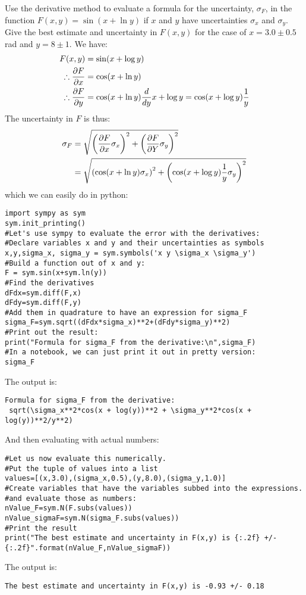 \begin{example}{}{Use the derivative method to evaluate a formula for the uncertainty, $\sigma_{F}$, in the function $F(x,y)=\sin(x+\ln y)$ if $x$ and $y$ have uncertainties $\sigma_{x}$ and $\sigma_{y}$. Give the best estimate and uncertainty in $F(x,y)$ for the case of $x=3.0\pm0.5$\,rad and $y=8\pm1$.}{}
We have:
\begin{align*}
F(x,y)&=\sin(x+\log y)\\
\therefore \frac{\partial F}{\partial x}&=\cos(x+\ln y)\\
\therefore \frac{\partial F}{\partial y}&=\cos(x+\ln y)\frac{d}{dy}x+\log y=\cos(x+\log y)\frac{1}{y}
\end{align*}
The uncertainty in $F$ is thus:
\begin{align*}
\sigma_{F}&= \sqrt{\left(\frac{\partial F}{\partial x}\sigma_{x}\right)^2 + \left(\frac{\partial F}{\partial Y} \sigma_{y}\right)^2}\\
  &= \sqrt{\left(\cos(x+\ln y)\sigma_{x}\right)^2 + \left(\cos(x+\log y)\frac{1}{y} \sigma_{y}\right)^2}\\
\end{align*}
which we can easily do in python:
\begin{lstlisting}[frame=single] 
import sympy as sym
sym.init_printing()
#Let's use sympy to evaluate the error with the derivatives:
#Declare variables x and y and their uncertainties as symbols
x,y,sigma_x, sigma_y = sym.symbols('x y \sigma_x \sigma_y')  
#Build a function out of x and y:
F = sym.sin(x+sym.ln(y)) 
#Find the derivatives
dFdx=sym.diff(F,x)
dFdy=sym.diff(F,y)
#Add them in quadrature to have an expression for sigma_F
sigma_F=sym.sqrt((dFdx*sigma_x)**2+(dFdy*sigma_y)**2)
#Print out the result:
print("Formula for sigma_F from the derivative:\n",sigma_F)
#In a notebook, we can just print it out in pretty version:
sigma_F
\end{lstlisting}
The output is:
\begin{verbatim}
Formula for sigma_F from the derivative:
 sqrt(\sigma_x**2*cos(x + log(y))**2 + \sigma_y**2*cos(x + log(y))**2/y**2)
\end{verbatim}
And then evaluating with actual numbers:
\begin{lstlisting}[frame=single] 
#Let us now evaluate this numerically.
#Put the tuple of values into a list
values=[(x,3.0),(sigma_x,0.5),(y,8.0),(sigma_y,1.0)]
#Create variables that have the variables subbed into the expressions.
#and evaluate those as numbers:
nValue_F=sym.N(F.subs(values))
nValue_sigmaF=sym.N(sigma_F.subs(values))
#Print the result
print("The best estimate and uncertainty in F(x,y) is {:.2f} +/- {:.2f}".format(nValue_F,nValue_sigmaF))
\end{lstlisting}
The output is:
\begin{verbatim}
The best estimate and uncertainty in F(x,y) is -0.93 +/- 0.18
\end{verbatim}
\end{example}


